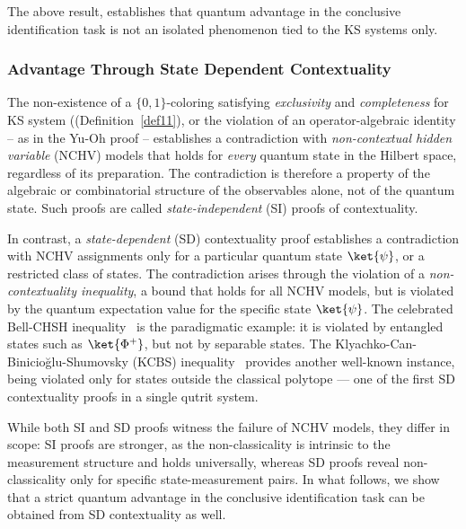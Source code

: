 \documentclass[12pt,a4paper]{article}
\begin{document}
\noindent The above result, establishes that 
quantum advantage in the conclusive identification task is not an isolated phenomenon tied to the KS systems only. 

\subsubsection{Advantage Through State Dependent Contextuality}

\noindent The non-existence of a $\{0,1\}$-coloring satisfying \emph{exclusivity} and \emph{completeness} for KS system ((Definition~\ref{def11}), or the violation of an operator-algebraic identity -- as in the Yu-Oh proof -- establishes a contradiction with \emph{non-contextual hidden variable} (NCHV) models that holds for \emph{every} quantum state in the Hilbert space, regardless of its preparation. The contradiction is therefore a property of the algebraic or combinatorial structure of the observables alone, not of the quantum state. Such proofs are called \emph{state-independent} (SI) proofs of contextuality.

\noindent In contrast, a \emph{state-dependent} (SD) contextuality proof establishes a contradiction with NCHV assignments only for a particular quantum state $\ket{\psi}$, or a restricted class of states. The contradiction arises through the violation of a \emph{non-contextuality inequality}, a bound that holds for all NCHV models, but is violated by the quantum expectation value for the specific state $\ket{\psi}$. The celebrated Bell-CHSH inequality~\cite{Bell1964,Bell1966,Mermin1990} is the paradigmatic example: it is violated by entangled states such as $\ket{\Phi^+}$, but not by separable states. The Klyachko-Can-Binicio\u{g}lu-Shumovsky (KCBS) inequality~\cite{Klyachko2008} provides another well-known instance, being violated only for states outside the classical polytope — one of the first SD contextuality proofs in a single qutrit system.

\noindent While both SI and SD proofs witness the failure of NCHV models, they differ in scope: SI proofs are stronger, as the non-classicality is intrinsic to the measurement structure and holds universally, whereas SD proofs reveal non-classicality only for specific state-measurement pairs. In what follows, we show that a strict quantum advantage in the conclusive identification task can be obtained from SD contextuality as well.
\end{document}
